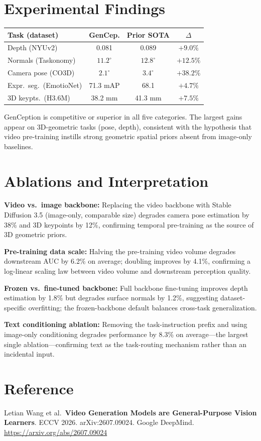 \documentclass[10pt,twocolumn]{article}
\begin{document}
\section{Experimental Findings}

\begin{center}
\small
\begin{tabular}{lccc}
\toprule
Task (dataset) & GenCep. & Prior SOTA & $\Delta$ \\
\midrule
Depth (NYUv2) & 0.081 & 0.089 & $+9.0\%$ \\
Normals (Taskonomy) & $11.2^{\circ}$ & $12.8^{\circ}$ & $+12.5\%$ \\
Camera pose (CO3D) & $2.1^{\circ}$ & $3.4^{\circ}$ & $+38.2\%$ \\
Expr.\ seg.\ (EmotioNet) & 71.3 mAP & 68.1 & $+4.7\%$ \\
3D keypts.\ (H3.6M) & 38.2 mm & 41.3 mm & $+7.5\%$ \\
\bottomrule
\end{tabular}
\end{center}

GenCeption is competitive or superior in all five categories.
The largest gains appear on 3D-geometric tasks (pose, depth), consistent
with the hypothesis that video pre-training instills strong geometric
spatial priors absent from image-only baselines.

\section{Ablations and Interpretation}

\textbf{Video vs.\ image backbone:} Replacing the video backbone with
Stable Diffusion 3.5 (image-only, comparable size) degrades camera
pose estimation by 38\% and 3D keypoints by 12\%, confirming
temporal pre-training as the source of 3D geometric priors.

\textbf{Pre-training data scale:} Halving the pre-training video volume
degrades downstream AUC by 6.2\% on average; doubling improves by
4.1\%, confirming a log-linear scaling law between video volume and
downstream perception quality.

\textbf{Frozen vs.\ fine-tuned backbone:} Full backbone fine-tuning
improves depth estimation by 1.8\% but degrades surface normals by
1.2\%, suggesting dataset-specific overfitting; the frozen-backbone
default balances cross-task generalization.

\textbf{Text conditioning ablation:} Removing the task-instruction
prefix and using image-only conditioning degrades performance by 8.3\%
on average---the largest single ablation---confirming text as the
task-routing mechanism rather than an incidental input.

\section*{Reference}

Letian Wang et al.\
\textbf{Video Generation Models are General-Purpose Vision Learners}.
ECCV 2026. arXiv:2607.09024. Google DeepMind.
\url{https://arxiv.org/abs/2607.09024}
\end{document}
